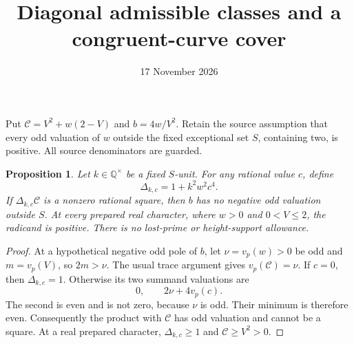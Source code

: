 \documentclass[11pt,a4paper]{article}
\title{Diagonal admissible classes and a congruent-curve cover}
\author{}\date{17 November 2026}
\newtheorem{proposition}{Proposition}
\newcommand{\Q}{\mathbb Q}
\begin{document}
\maketitle

Put $\mathcal C=V^2+w(2-V)$ and $b=4w/V^2$. Retain the source
assumption that every odd valuation of $w$ outside the fixed exceptional
set $S$, containing two, is positive. All source denominators are guarded.

\begin{proposition}\label{prop:class}
Let $k\in\Q^\times$ be a fixed $S$-unit. For any rational value $c$,
define
\[
                    \Delta_{k,c}=1+k^2w^2c^4.
\]
If $\Delta_{k,c}\mathcal C$ is a nonzero rational square, then $b$
has no negative odd valuation outside $S$. At every prepared real
character, where $w>0$ and $0<V\le2$, the radicand is positive.
There is no lost-prime or height-support allowance.
\end{proposition}
\begin{proof}
At a hypothetical negative odd pole of $b$, let $\nu=v_p(w)>0$ be
odd and $m=v_p(V)$, so $2m>\nu$. The usual trace argument gives
$v_p(\mathcal C)=\nu$. If $c=0$, then $\Delta_{k,c}=1$.
Otherwise its two summand valuations are
\[
                         0,\qquad 2\nu+4v_p(c).
\]
The second is even and is not zero, because $\nu$ is odd. Their
minimum is therefore even. Consequently the product with $\mathcal C$
has odd valuation and cannot be a square. At a real prepared character,
$\Delta_{k,c}\ge1$ and $\mathcal C\ge V^2>0$.
\end{proof}
\end{document}
